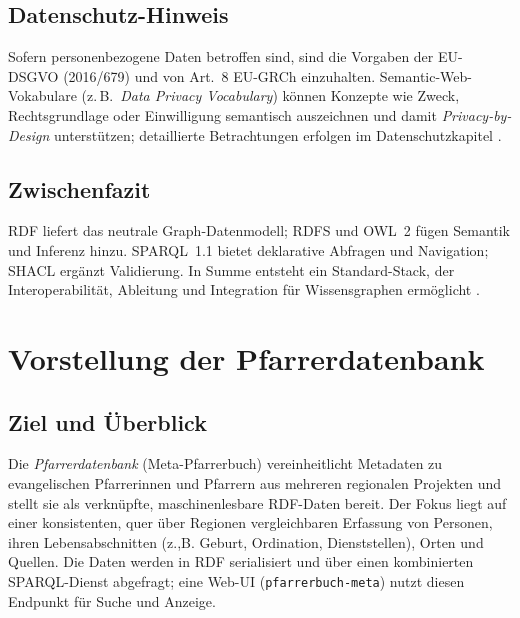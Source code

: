 \subsection{Datenschutz-Hinweis}

Sofern personenbezogene Daten betroffen sind, sind die Vorgaben der EU-DSGVO (2016/679) und von Art.~8 EU-GRCh einzuhalten. Semantic-Web-Vokabulare (z.\,B.\ \emph{Data Privacy Vocabulary}) können Konzepte wie Zweck, Rechtsgrundlage oder Einwilligung semantisch auszeichnen und damit \emph{Privacy-by-Design} unterstützen; detaillierte Betrachtungen erfolgen im Datenschutzkapitel \cite{euGDPR2016}.

\subsection*{Zwischenfazit}

RDF liefert das neutrale Graph-Datenmodell; RDFS und OWL~2 fügen Semantik und Inferenz hinzu. SPARQL~1.1 bietet deklarative Abfragen und Navigation; SHACL ergänzt Validierung. In Summe entsteht ein Standard-Stack, der Interoperabilität, Ableitung und Integration für Wissensgraphen ermöglicht \cite{Hitzler,RDF11Primer,RDFS11,OWL2Overview,SPARQL11Overview,hogan2021}.







\section{Vorstellung der Pfarrerdatenbank}
\label{sec:Pfarrerdatenbank}

\subsection{Ziel und Überblick}
Die \emph{Pfarrerdatenbank} (Meta-Pfarrerbuch) vereinheitlicht Metadaten zu evangelischen Pfarrerinnen und Pfarrern aus mehreren regionalen Projekten und stellt sie als verknüpfte, maschinenlesbare RDF-Daten bereit. Der Fokus liegt auf einer konsistenten, quer über Regionen vergleichbaren Erfassung von Personen, ihren Lebensabschnitten (z.,B. Geburt, Ordination, Dienststellen), Orten und Quellen. Die Daten werden in RDF serialisiert und über einen kombinierten SPARQL-Dienst abgefragt; eine Web-UI (\texttt{pfarrerbuch-meta}) nutzt diesen Endpunkt für Suche und Anzeige.

